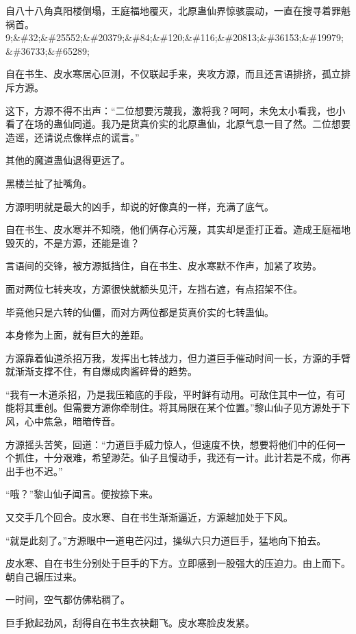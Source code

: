
\begin{this_body}

自八十八角真阳楼倒塌，王庭福地覆灭，北原蛊仙界惊骇震动，一直在搜寻着罪魁祸首。9;\&\#32;\&\#25552;\&\#20379;\&\#84;\&\#120;\&\#116;\&\#20813;\&\#36153;\&\#19979;\&\#36733;\&\#65289;

自在书生、皮水寒居心叵测，不仅联起手来，夹攻方源，而且还言语排挤，孤立排斥方源。

这下，方源不得不出声：“二位想要污蔑我，激将我？呵呵，未免太小看我，也小看了在场的蛊仙同道。我乃是货真价实的北原蛊仙，北原气息一目了然。二位想要造谣，还请说点像样点的谎言。”

其他的魔道蛊仙退得更远了。

黑楼兰扯了扯嘴角。

方源明明就是最大的凶手，却说的好像真的一样，充满了底气。

自在书生、皮水寒并不知晓，他们俩存心污蔑，其实却是歪打正着。造成王庭福地毁灭的，不是方源，还能是谁？

言语间的交锋，被方源抵挡住，自在书生、皮水寒默不作声，加紧了攻势。

面对两位七转夹攻，方源很快就额头见汗，左挡右遮，有点招架不住。

毕竟他只是六转的仙僵，而对方两位都是货真价实的七转蛊仙。

本身修为上面，就有巨大的差距。

方源靠着仙道杀招万我，发挥出七转战力，但力道巨手催动时间一长，方源的手臂就渐渐支撑不住，有自爆成肉酱碎骨的趋势。

“我有一木道杀招，乃是我压箱底的手段，平时鲜有动用。可敌住其中一位，有可能将其重创。但需要方源你牵制住。将其局限在某个位置。”黎山仙子见方源处于下风，心中焦急，暗暗传音。

方源摇头苦笑，回道：“力道巨手威力惊人，但速度不快，想要将他们中的任何一个抓住，十分艰难，希望渺茫。仙子且慢动手，我还有一计。此计若是不成，你再出手也不迟。”

“哦？”黎山仙子闻言。便按捺下来。

又交手几个回合。皮水寒、自在书生渐渐逼近，方源越加处于下风。

“就是此刻了。”方源眼中一道电芒闪过，操纵六只力道巨手，猛地向下拍去。

皮水寒、自在书生分别处于巨手的下方。立即感到一股强大的压迫力。由上而下。朝自己辗压过来。

一时间，空气都仿佛粘稠了。

巨手掀起劲风，刮得自在书生衣袂翻飞。皮水寒脸皮发紧。


\end{this_body}
